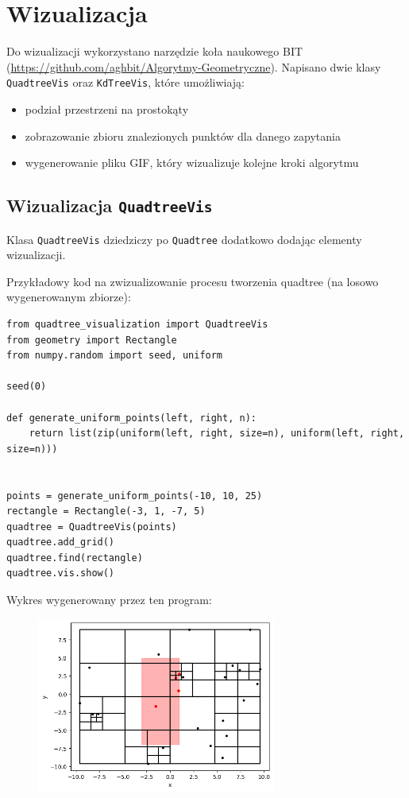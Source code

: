 \documentclass[11pt]{scrartcl}
\begin{document}
\section{Wizualizacja}
Do wizualizacji wykorzystano narzędzie koła naukowego BIT (\url{https://github.com/aghbit/Algorytmy-Geometryczne}). Napisano dwie klasy \texttt{QuadtreeVis} oraz \texttt{KdTreeVis}, które umożliwiają:
\begin{itemize}
    \item podział przestrzeni na prostokąty
    \item zobrazowanie zbioru znalezionych punktów dla danego zapytania
    \item wygenerowanie pliku GIF, który wizualizuje kolejne kroki algorytmu
\end{itemize}

\subsection{Wizualizacja \texttt{QuadtreeVis}}
Klasa \texttt{QuadtreeVis} dziedziczy po \texttt{Quadtree} dodatkowo dodając elementy wizualizacji.

Przykładowy kod na zwizualizowanie procesu tworzenia quadtree (na losowo wygenerowanym zbiorze):

\begin{verbatim}
from quadtree_visualization import QuadtreeVis
from geometry import Rectangle
from numpy.random import seed, uniform

seed(0)

def generate_uniform_points(left, right, n):
    return list(zip(uniform(left, right, size=n), uniform(left, right, size=n)))


points = generate_uniform_points(-10, 10, 25)
rectangle = Rectangle(-3, 1, -7, 5)
quadtree = QuadtreeVis(points)
quadtree.add_grid()
quadtree.find(rectangle)
quadtree.vis.show()
\end{verbatim}

\newpage
Wykres wygenerowany przez ten program:

\begin{figure}[H]
    \centering
    \includegraphics[width=0.7\textwidth]{imgs/quadtree_vis.png}
\end{figure}
\end{document}
